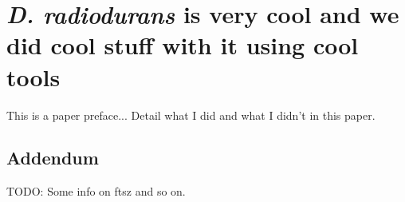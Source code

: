 \chapter[\textit{D. radiodurans}: short title]{\textit{D. radiodurans} is very cool and we did cool stuff with it using cool tools}\label{drad}

This is a paper preface... Detail what I did and what I didn't in this paper.


\localtableofcontents  %

% 

\section{Addendum}

TODO: Some info on ftsz and so on.
